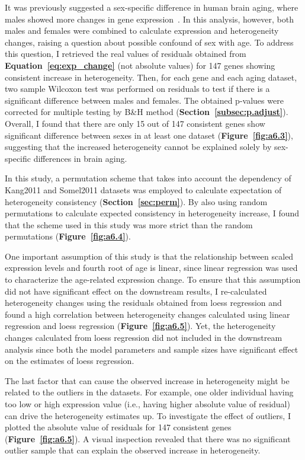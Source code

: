 It was previously suggested a sex-specific difference in human brain aging, where males showed more changes in gene expression~\cite{Berchtold2008}.
In this analysis, however, both males and females were combined to calculate expression and heterogeneity changes, raising a question about possible confound of sex with age.
To address this question, I retrieved the real values of residuals obtained from \textbf{Equation~\ref{eq:exp_change}} 
(not absolute values) for 147 genes showing consistent increase in heterogeneity.
Then, for each gene and each aging dataset, two sample Wilcoxon test was performed on residuals to test if there is a significant difference between males and females.
The obtained p-values were corrected for multiple testing by B{\&}H method (\textbf{Section~\ref{subsec:p.adjust}}).
Overall, I found that there are only 15 out of 147 consistent genes show significant difference between sexes in at least one dataset (\textbf{Figure~\ref{fig:a6.3}}),
suggesting that the increased heterogeneity cannot be explained solely by sex-specific differences in brain aging.

In this study, a permutation scheme that takes into account the dependency of Kang2011 and Somel2011 
datasets was employed to calculate expectation of heterogeneity consistency (\textbf{Section~\ref{sec:perm}}).
By also using random permutations to calculate expected consistency in heterogeneity increase, 
I found that the scheme used in this study was more strict than the random permutations (\textbf{Figure~\ref{fig:a6.4}}).

One important assumption of this study is that the relationship between scaled expression levels and fourth root of age is linear,
since linear regression was used to characterize the age-related expression change.
To ensure that this assumption did not have significant effect on the downstream results, 
I re-calculated heterogeneity changes using the residuals obtained from loess regression and 
found a high correlation between heterogeneity changes calculated using linear regression and loess regression (\textbf{Figure~\ref{fig:a6.5}}).
Yet, the heterogeneity changes calculated from loess regression did not included in the downstream analysis
since both the model parameters and sample sizes have significant effect on the estimates of loess regression.

The last factor that can cause the observed increase in heterogeneity might be related to the outliers in the datasets.
For example, one older individual having too low or high expression value (i.e., having higher absolute value of residual) 
can drive the heterogeneity estimates up.
To investigate the effect of outliers, I plotted the absolute value of residuals for 147 consistent genes (\textbf{Figure~\ref{fig:a6.5}}).
A visual inspection revealed that there was no significant outlier sample that can explain the observed increase in heterogeneity.

